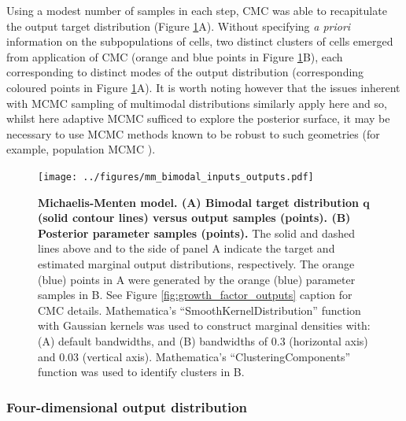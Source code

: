 Using a modest number of samples in each step, CMC was able to recapitulate the output target distribution (Figure \ref{fig:mm_bimodal_inputs_outputs}A). Without specifying \textit{a priori} information on the subpopulations of cells, two distinct clusters of cells emerged from application of CMC (orange and blue points in Figure \ref{fig:mm_bimodal_inputs_outputs}B), each corresponding to distinct modes of the output distribution (corresponding coloured points in Figure \ref{fig:mm_bimodal_inputs_outputs}A). It is worth noting however that the issues inherent with MCMC sampling of multimodal distributions similarly apply here and so, whilst here adaptive MCMC \cite{johnstone2016uncertainty} sufficed to explore the posterior surface, it may be necessary to use MCMC methods known to be robust to such geometries (for example, population MCMC \cite{jasra2007population}).

\begin{figure}[H]
\centerline{\texttt{[image: ../figures/mm\_bimodal\_inputs\_outputs.pdf]}}
\caption{\textbf{Michaelis-Menten model. (A) Bimodal target distribution $\boldsymbol{q}$ (solid contour lines) versus output samples (points). (B) Posterior parameter samples (points).} The solid and dashed lines above and to the side of panel A indicate the target and estimated marginal output distributions, respectively. The orange (blue) points in A were generated by the orange (blue) parameter samples in B. See Figure \ref{fig:growth_factor_outputs} caption for CMC details. Mathematica's ``SmoothKernelDistribution'' function \cite{mathematica} with Gaussian kernels was used to construct marginal densities with: (A) default bandwidths, and (B) bandwidths of 0.3 (horizontal axis) and 0.03 (vertical axis). Mathematica's ``ClusteringComponents'' function \cite{mathematica} was used to identify clusters
in B.}
\label{fig:mm_bimodal_inputs_outputs}
\end{figure}

\subsubsection{Four-dimensional output distribution}

